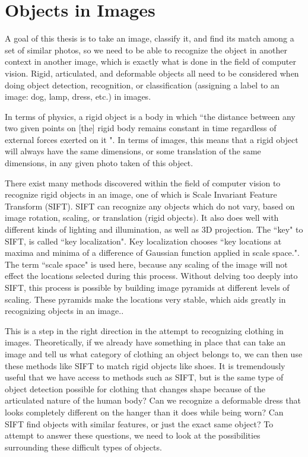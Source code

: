\documentclass[12pt]{report} %
\begin{document}
\section{Objects in Images}

	A goal of this thesis is to take an image, classify it, and find its match among a set of similar photos, so we need to be able to recognize the object in another context in another image, which is exactly what is done in the field of computer vision. Rigid, articulated, and deformable objects all need to be considered when doing object detection, recognition, or classification (assigning a label to an image: dog, lamp, dress, etc.) in images. 
	
	In terms of physics, a rigid object is a body in which ``the distance between any two given points on [the] rigid body remains constant in time regardless of external forces exerted on it "\cite{RigidBodyWiki}. In terms of images, this means that a rigid object will always have the same dimensions, or some translation of the same dimensions, in any given photo taken of this object. 
	
	There exist many methods discovered within the field of computer vision to recognize rigid objects in an image, one of which is Scale Invariant Feature Transform (SIFT)\cite{lowe1999object}. SIFT can recognize any objects which do not vary, based on image rotation, scaling, or translation (rigid objects). It also does well with different kinds of lighting and illumination, as well as 3D projection\cite{lowe1999object}. The ``key" to SIFT, is called ``key localization". Key localization chooses ``key locations at maxima and minima of a difference of Gaussian function applied in scale space."\cite{lowe1999object}. The term ``scale space" is used here, because any scaling of the image will not effect the locations selected during this process. Without delving too deeply into SIFT, this process is possible by building image pyramids at different levels of scaling. These pyramids make the locations very stable, which aids greatly in recognizing objects in an image.\cite{lowe1999object}.

	This is a step in the right direction in the attempt to recognizing clothing in images. Theoretically, if we already have something in place that can take an image and tell us what category of clothing an object belongs to, we can then use these methods like SIFT to match rigid objects like shoes. It is tremendously useful that we have access to methods such as SIFT, but is the same type of object detection possible for clothing that changes shape because of the articulated nature of the human body? Can we recognize a deformable dress that looks completely different on the hanger than it does while being worn? Can SIFT find objects with similar features, or just the exact same object? To attempt to answer these questions, we need to look at the possibilities surrounding these difficult types of objects. 
	
\end{document}
